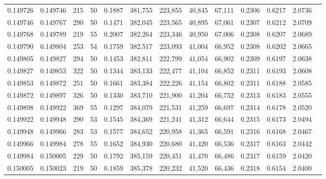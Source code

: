 \begin{tabular}{rrrrrrrrrrrrr}
0.149726 & 0.149746 &   215 &  50 &                                     0.1887 & 381,755 & 223,855 &  40,845 &  67,111 & 0.2306 & 0.6217 & 2.0736 \\
0.149746 & 0.149767 &   290 &  50 &                                     0.1471 & 382,045 & 223,565 &  40,895 &  67,061 & 0.2307 & 0.6212 & 2.0709 \\
0.149768 & 0.149789 &   219 &  55 &                                     0.2007 & 382,264 & 223,346 &  40,950 &  67,006 & 0.2308 & 0.6207 & 2.0689 \\
0.149790 & 0.149804 &   253 &  54 &                                     0.1759 & 382,517 & 223,093 &  41,004 &  66,952 & 0.2308 & 0.6202 & 2.0665 \\
0.149805 & 0.149827 &   294 &  50 &                                     0.1453 & 382,811 & 222,799 &  41,054 &  66,902 & 0.2309 & 0.6197 & 2.0638 \\
0.149827 & 0.149853 &   322 &  50 &                                     0.1344 & 383,133 & 222,477 &  41,104 &  66,852 & 0.2311 & 0.6193 & 2.0608 \\
0.149853 & 0.149872 &   251 &  50 &                                     0.1661 & 383,384 & 222,226 &  41,154 &  66,802 & 0.2311 & 0.6188 & 2.0585 \\
0.149872 & 0.149897 &   326 &  50 &                                     0.1330 & 383,710 & 221,900 &  41,204 &  66,752 & 0.2313 & 0.6183 & 2.0555 \\
0.149898 & 0.149922 &   369 &  55 &                                     0.1297 & 384,079 & 221,531 &  41,259 &  66,697 & 0.2314 & 0.6178 & 2.0520 \\
0.149922 & 0.149948 &   290 &  53 &                                     0.1545 & 384,369 & 221,241 &  41,312 &  66,644 & 0.2315 & 0.6173 & 2.0494 \\
0.149948 & 0.149966 &   283 &  53 &                                     0.1577 & 384,652 & 220,958 &  41,365 &  66,591 & 0.2316 & 0.6168 & 2.0467 \\
0.149966 & 0.149984 &   278 &  55 &                                     0.1652 & 384,930 & 220,680 &  41,420 &  66,536 & 0.2317 & 0.6163 & 2.0442 \\
0.149984 & 0.150005 &   229 &  50 &                                     0.1792 & 385,159 & 220,451 &  41,470 &  66,486 & 0.2317 & 0.6159 & 2.0420 \\
0.150005 & 0.150023 &   219 &  50 &                                     0.1859 & 385,378 & 220,232 &  41,520 &  66,436 & 0.2318 & 0.6154 & 2.0400 \\

\end{tabular}
